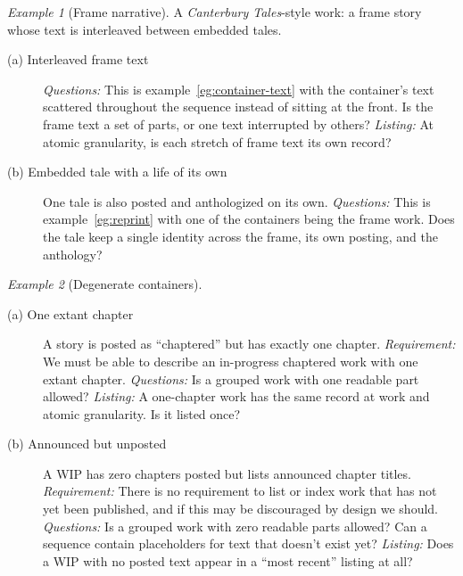 \documentclass{amsart}
\theoremstyle{remark}
\newtheorem{eg}{Example}
\begin{document}
    \begin{eg}[Frame narrative]\label{eg:frame}
        A \textit{Canterbury Tales}-style work: a frame story whose text is interleaved between embedded tales.
        \begin{description}
          \item[(a) Interleaved frame text] \emph{Questions:} This is example~\ref{eg:container-text} with the container's text scattered throughout the sequence instead of sitting at the front. Is the frame text a set of parts, or one text interrupted by others?
          \emph{Listing:} At atomic granularity, is each stretch of frame text its own record?
          \item[(b) Embedded tale with a life of its own] One tale is also posted and anthologized on its own.
          \emph{Questions:} This is example~\ref{eg:reprint} with one of the containers being the frame work. Does the tale keep a single identity across the frame, its own posting, and the anthology?
        \end{description}
    \end{eg}
    \begin{eg}[Degenerate containers]\label{eg:degenerate}
        \begin{description}
          \item[(a) One extant chapter] A story is posted as ``chaptered'' but has exactly one chapter.
          \emph{Requirement:} We must be able to describe an in-progress chaptered work with one extant chapter.
          \emph{Questions:} Is a grouped work with one readable part allowed?
          \emph{Listing:} A one-chapter work has the same record at work and atomic granularity. Is it listed once?
          \item[(b) Announced but unposted] A WIP has zero chapters posted but lists announced chapter titles.
          \emph{Requirement:} There is no requirement to list or index work that has not yet been published, and if this may be discouraged by design we should.
          \emph{Questions:} Is a grouped work with zero readable parts allowed? Can a sequence contain placeholders for text that doesn't exist yet?
          \emph{Listing:} Does a WIP with no posted text appear in a ``most recent'' listing at all?
        \end{description}
    \end{eg}
\end{document}
